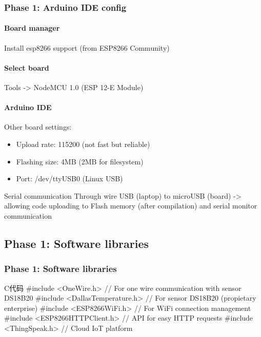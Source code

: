 \documentclass[
    aspectratio=169,                   %
]{beamer}
\begin{document}
    \begin{frame}
        \frametitle{Phase 1: Arduino IDE config}
        
        \paragraph{Board manager} Install \alert{esp8266} support (from ESP8266 Community)

        \paragraph{Select board} Tools -> NodeMCU 1.0 (ESP 12-E Module)

        \paragraph{Arduino IDE} Other board settings: 

        \begin{itemize}
            \item \alert{Upload rate}: 115200 (not fast but reliable)
            \item \alert{Flashing size}: 4MB (2MB for filesystem)
            \item \alert{Port}: /dev/ttyUSB0 (Linux USB)
        \end{itemize}

        \begin{block}{Serial communication}
            Through wire USB (laptop) to microUSB (board) -> allowing code uploading to Flash memory (after compilation) and serial monitor communication
        \end{block}
    \end{frame}

\subsection{Phase 1: Software libraries}

    \begin{frame}[fragile]          %
        \frametitle{Phase 1: Software libraries}
        \begin{codeblock}[language=c]{C代码}
#include <OneWire.h> // For one wire communication with sensor DS18B20
#include <DallasTemperature.h> // For sensor DS18B20 (propietary enterprise)
#include <ESP8266WiFi.h> // For WiFi connection management
#include <ESP8266HTTPClient.h> // API for easy HTTP requests
#include <ThingSpeak.h> // Cloud IoT platform
        \end{codeblock}
    \end{frame}
\end{document}
